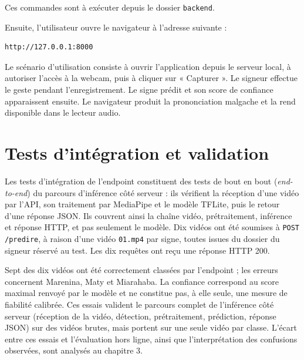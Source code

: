 Ces commandes sont à exécuter depuis le dossier \texttt{backend}.

Ensuite, l'utilisateur ouvre le navigateur à l'adresse suivante :

\begin{verbatim}
http://127.0.0.1:8000
\end{verbatim}

Le scénario d'utilisation consiste à ouvrir l'application depuis le serveur local, à autoriser l'accès à la webcam, puis à cliquer sur « Capturer ». Le signeur effectue le geste pendant l'enregistrement. Le signe prédit et son score de confiance apparaissent ensuite. Le navigateur produit la prononciation malgache et la rend disponible dans le lecteur audio.

\section{Tests d'intégration et validation}

Les tests d'intégration de l'endpoint constituent des tests de bout en bout (\textit{end-to-end}) du parcours d'inférence côté serveur : ils vérifient la réception d'une vidéo par l'API, son traitement par MediaPipe et le modèle TFLite, puis le retour d'une réponse JSON. Ils couvrent ainsi la chaîne vidéo, prétraitement, inférence et réponse HTTP, et pas seulement le modèle. Dix vidéos ont été soumises à \texttt{POST /predire}, à raison d'une vidéo \texttt{01.mp4} par signe, toutes issues du dossier du signeur réservé au test. Les dix requêtes ont reçu une réponse HTTP 200.

Sept des dix vidéos ont été correctement classées par l'endpoint ; les erreurs concernent Marenina, Maty et Miarahaba. La confiance correspond au score maximal renvoyé par le modèle et ne constitue pas, à elle seule, une mesure de fiabilité calibrée. Ces essais valident le parcours complet de l'inférence côté serveur (réception de la vidéo, détection, prétraitement, prédiction, réponse JSON) sur des vidéos brutes, mais portent sur une seule vidéo par classe. L'écart entre ces essais et l'évaluation hors ligne, ainsi que l'interprétation des confusions observées, sont analysés au chapitre 3.

